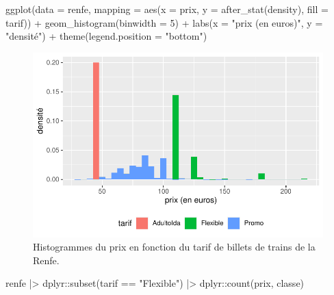 \documentclass[
  11pt,
  letterpaper,
]{scrbook}
\newenvironment{Shaded}{\begin{snugshade}}{\end{snugshade}}
\newcommand{\AttributeTok}[1]{\textcolor[rgb]{0.40,0.45,0.13}{#1}}
\newcommand{\DecValTok}[1]{\textcolor[rgb]{0.68,0.00,0.00}{#1}}
\newcommand{\FunctionTok}[1]{\textcolor[rgb]{0.28,0.35,0.67}{#1}}
\newcommand{\NormalTok}[1]{\textcolor[rgb]{0.00,0.23,0.31}{#1}}
\newcommand{\SpecialCharTok}[1]{\textcolor[rgb]{0.37,0.37,0.37}{#1}}
\newcommand{\StringTok}[1]{\textcolor[rgb]{0.13,0.47,0.30}{#1}}
\theoremstyle{definition}
\theoremstyle{remark}
\begin{document}
\begin{Shaded}
\begin{Highlighting}[]
\FunctionTok{ggplot}\NormalTok{(}\AttributeTok{data =}\NormalTok{ renfe, }
       \AttributeTok{mapping =} \FunctionTok{aes}\NormalTok{(}\AttributeTok{x =}\NormalTok{ prix, }
                     \AttributeTok{y =} \FunctionTok{after\_stat}\NormalTok{(density), }
                     \AttributeTok{fill =}\NormalTok{ tarif)) }\SpecialCharTok{+}
    \FunctionTok{geom\_histogram}\NormalTok{(}\AttributeTok{binwidth =} \DecValTok{5}\NormalTok{) }\SpecialCharTok{+}
    \FunctionTok{labs}\NormalTok{(}\AttributeTok{x =} \StringTok{"prix (en euros)"}\NormalTok{, }
         \AttributeTok{y =} \StringTok{"densité"}\NormalTok{) }\SpecialCharTok{+} 
    \FunctionTok{theme}\NormalTok{(}\AttributeTok{legend.position =} \StringTok{"bottom"}\NormalTok{)}
\end{Highlighting}
\end{Shaded}

\begin{figure}[ht!]

{\centering \includegraphics[width=1\textwidth,height=\textheight]{analyseexploratoire_files/figure-pdf/fig-renfe-aed7-1.pdf}

}

\caption{\label{fig-renfe-aed7}Histogrammes du prix en fonction du tarif
de billets de trains de la Renfe.}

\end{figure}

\begin{Shaded}
\begin{Highlighting}[]
\NormalTok{renfe }\SpecialCharTok{|\textgreater{}}
\NormalTok{  dplyr}\SpecialCharTok{::}\FunctionTok{subset}\NormalTok{(tarif  }\SpecialCharTok{==} \StringTok{"Flexible"}\NormalTok{) }\SpecialCharTok{|\textgreater{}}
\NormalTok{  dplyr}\SpecialCharTok{::}\FunctionTok{count}\NormalTok{(prix, classe)}
\end{Highlighting}
\end{Shaded}
\end{document}

